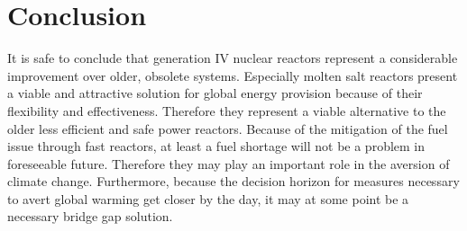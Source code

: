 \chapter{Conclusion}
It is safe to conclude that generation IV nuclear reactors represent a considerable improvement
over older, obsolete systems. Especially molten salt reactors present a viable and attractive
solution for global energy provision because of their flexibility and effectiveness.
Therefore they represent a viable alternative to the older less
efficient and safe power reactors. Because of the mitigation of the fuel issue through fast reactors,
at least a fuel shortage will not be a problem in foreseeable future. Therefore they may play an
important role in the aversion of climate change. Furthermore, because the decision horizon for
measures necessary to avert global warming get closer by the day, it may at some point be a
necessary bridge gap solution. 